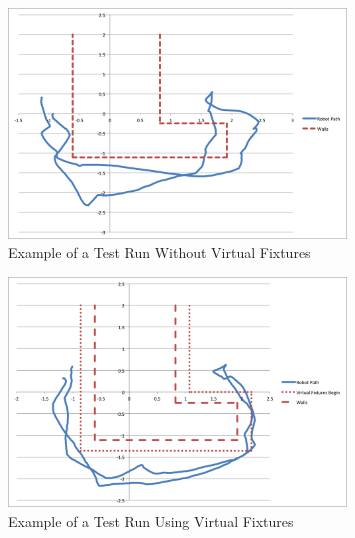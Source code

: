 \documentclass[onecolumn,10pt,final]{asme2ej}
\begin{document}
\begin{figure}[htbp!]
    \centering
    \includegraphics[width=0.8\textwidth]{collisions.png}
    \caption{Example of a Test Run Without Virtual Fixtures}
    \label{fig:collisions}
\end{figure} 

\begin{figure}[htbp!]
    \centering
    \includegraphics[width=0.8\textwidth]{goodrun.png}
    \caption{Example of a Test Run Using Virtual Fixtures}
    \label{fig:smooth}
\end{figure} 
\end{document}

